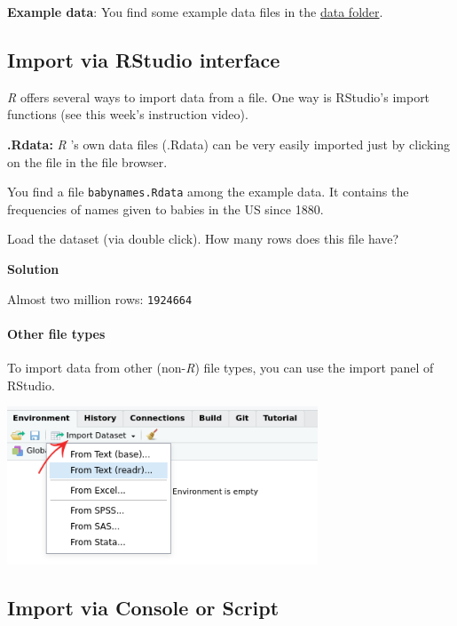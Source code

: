\documentclass[
]{scrartcl}
\makeatletter
\newenvironment{kframe}{%
\medskip{}
\setlength{\fboxsep}{.8em}
 \def\at@end@of@kframe{}%
 \ifinner\ifhmode%
  \def\at@end@of@kframe{\end{minipage}}%
  \begin{minipage}{\columnwidth}%
 \fi\fi%
 \def\FrameCommand##1{\hskip\@totalleftmargin \hskip-\fboxsep
 \colorbox{shadecolor}{##1}\hskip-\fboxsep
     \hskip-\linewidth \hskip-\@totalleftmargin \hskip\columnwidth}%
 \MakeFramed {\advance\hsize-\width
   \@totalleftmargin\z@ \linewidth\hsize
   \@setminipage}}%
 {\par\unskip\endMakeFramed%
 \at@end@of@kframe}
\newenvironment{rmdblock}[1]
  {
  \begin{itemize}
  \renewcommand{\labelitemi}{
    \raisebox{-.7\height}[0pt][0pt]{
      {\setkeys{Gin}{width=3em,keepaspectratio}\texttt{[image: images/\#1]}}
    }
  }
  \setlength{\fboxsep}{1em}
  \begin{kframe}
  \item
  }
  {
  \end{kframe}
  \end{itemize}
  }
\newenvironment{myexercise}
    {\begin{rmdblock}{exercise_green}}
    {\end{rmdblock}}
\newenvironment{webexsolution}[1]
    {\par\tiny\textbf{#1}}
    {\par}
\newcommand{\webexhide}[1]{\begin{webexsolution}{#1}}
\newcommand{\webexunhide}{\end{webexsolution}}
\makeatother
\begin{document}
\textbf{Example data}: You find some example data files in the \href{./data}{data folder}.

\hypertarget{import-via-rstudio-interface}{%
\subsection{Import via RStudio interface}\label{import-via-rstudio-interface}}

\emph{R} offers several ways to import data from a file. One way is RStudio's import functions (see this week's instruction video).

\textbf{.Rdata:} \emph{R} 's own data files (.Rdata) can be very easily imported just by clicking on the file in the file browser.

\begin{myexercise}
You find a file \texttt{babynames.Rdata} among the example data. It
contains the frequencies of names given to babies in the US since 1880.

Load the dataset (via double click). How many rows does this file have?
\end{myexercise}

\webexhide{Solution}

Almost two million rows: \texttt{1924664}
\webexunhide

\hypertarget{other-file-types}{%
\paragraph*{Other file types}\label{other-file-types}}

To import data from other (non-\emph{R}) file types, you can use the import panel of RStudio.

\includegraphics[width=350px]{images/data_import}

\hypertarget{import-via-console-or-script}{%
\subsection{Import via Console or Script}\label{import-via-console-or-script}}
\end{document}
